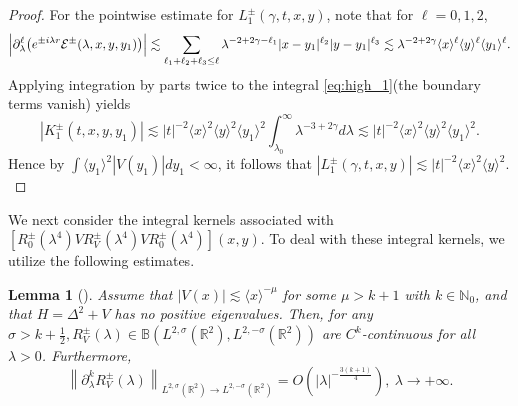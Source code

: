 \documentclass[reqno]{amsart}
\newtheorem{lemma}[theorem]{Lemma}
\numberwithin{equation}{section}
\begin{document}
\begin{proof}
 For the pointwise estimate for $L_{1}^{\pm}(\gamma,t,x,y)$, note that for $\ell=0,1,2$,
\[
\Bigl|\partial_\lambda^\ell \bigl( e^{\pm i\lambda r} \mathcal{E}^\pm(\lambda,x,y,y_1)\bigr)\Bigr|
\lesssim\sum_{\ell_1+\ell_2+\ell_3 \leq\ell}\lambda^{-2+2\gamma-\ell_1}|x-y_1|^{\ell_2}|y-y_1|^{\ell_3}
\lesssim\lambda^{-2+2\gamma}\langle x\rangle^\ell\langle y\rangle^\ell\langle y_1\rangle^\ell.
\]
Applying integration by parts twice to the integral \eqref{eq:high_1}(the boundary terms vanish) yields
\[
|K_1^\pm(t,x,y,y_1)| \lesssim |t|^{-2}\langle x\rangle^2\langle y\rangle^2\langle y_1\rangle^2
\int_{\lambda_0}^\infty\lambda^{-3+2\gamma}d\lambda
\lesssim |t|^{-2}\langle x\rangle^2\langle y\rangle^2\langle y_1\rangle^2.
\]
Hence by $\int \langle y_1\rangle^2|V(y_1)| dy_1 < \infty$, it follows that $\left|L_{1}^{\pm}(\gamma,t,x,y)\right| \lesssim |t|^{-2} \langle x \rangle^2 \langle y \rangle^2.$
\end{proof}

We next consider the integral kernels associated with $[R_0^{\pm}(\lambda^4)VR_V^{\pm}(\lambda^4)VR_0^{\pm}(\lambda^4)](x, y).$
To deal with these integral kernels, we utilize the following estimates.
\begin{lemma}[{\cite[Theorem 2.23]{FSY}}]\label{RRR}
Assume that $|V(x)| \lesssim \langle x \rangle^{-\mu}$ for some $\mu > k+1$ with $k \in \mathbb{N}_0$, and that $H = \Delta^2 + V$ has no positive eigenvalues. Then, for any $\sigma>k+\frac{1}{2}, R_V^{ \pm}(\lambda) \in \mathbb{B}\left(L^{2,\sigma}(\mathbb{R}^2), L^{2,-\sigma}(\mathbb{R}^2)\right)$ are $C^k$-continuous for all $\lambda>0$. Furthermore,
$$
\left\|\partial_\lambda^{k} R_V^{ \pm}(\lambda)\right\|_{L^{2,\sigma}(\mathbb{R}^2) \rightarrow L^{2,-\sigma}(\mathbb{R}^2)}=O\left(|\lambda|^{-\frac{3(k+1)}{4}}\right),~\lambda \rightarrow+\infty.
$$
\end{lemma}
\end{document}
